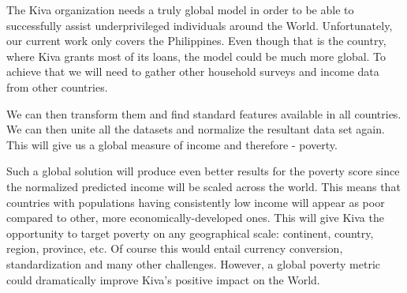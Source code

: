 \documentclass{article}
\begin{document}
The Kiva organization needs a truly global model in order to be able to successfully assist underprivileged individuals around the World. Unfortunately, our current work only covers the Philippines. Even though that is the country, where Kiva grants most of its loans, the model could be much more global. To achieve that we will need to gather other household surveys and income data from other countries.

We can then transform them and find standard features available in all countries. We can then unite all the datasets and normalize the resultant data set again. This will give us a global measure of income and therefore - poverty.

Such a global solution will produce even better results for the poverty score since the normalized predicted income will be scaled across the world. This means that countries with populations having consistently low income will appear as poor compared to other, more economically-developed ones. This will give Kiva the opportunity to target poverty on any geographical scale: continent, country, region, province, etc. Of course this would entail currency conversion, standardization and many other challenges. However, a global poverty metric could dramatically improve Kiva’s positive impact on the World.

\end{document}
